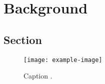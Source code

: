 \chapter{Background}

\section{Section}

\begin{figure}[htb]
    \centering
    \texttt{[image: example-image]}
    \caption{Caption \cite{taub1951}.}
    \label{fig:label-name}
\end{figure}